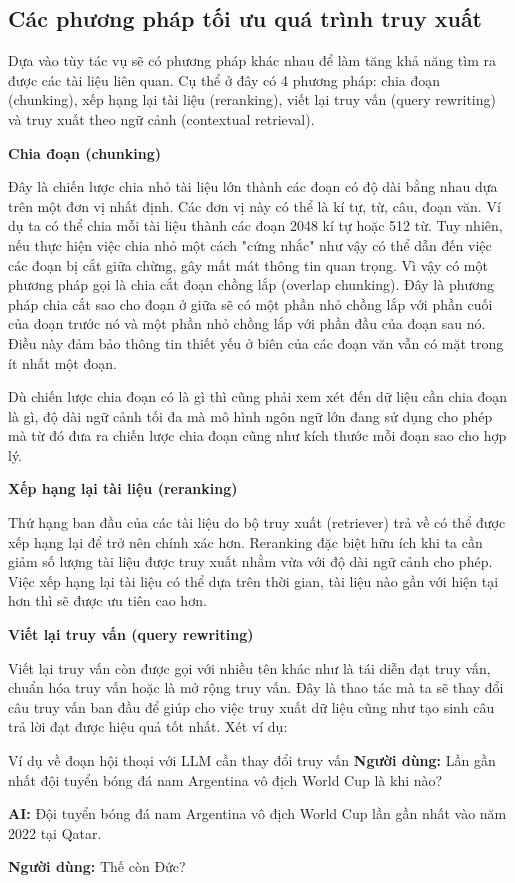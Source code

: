 \vspace{1em}
\subsection{Các phương pháp tối ưu quá trình truy xuất}
Dựa vào tùy tác vụ sẽ có phương pháp khác nhau để làm tăng khả năng tìm ra được các tài liệu liên quan. Cụ thể ở đây có 4 phương pháp: chia đoạn (chunking), xếp hạng lại tài liệu (reranking), viết lại truy vấn (query rewriting) và truy xuất theo ngữ cảnh (contextual retrieval).

\vspace{1em}
\textbf{Chia đoạn (chunking)}

Đây là chiến lược chia nhỏ tài liệu lớn thành các đoạn có độ dài bằng nhau dựa trên một đơn vị nhất định. Các đơn vị này có thể là kí tự, từ, câu, đoạn văn. Ví dụ ta có thể chia mỗi tài liệu thành các đoạn 2048 kí tự hoặc 512 từ. Tuy nhiên, nếu thực hiện việc chia nhỏ một cách "cứng nhắc" như vậy có thể dẫn đến việc các đoạn bị cắt giữa chừng, gây mất mát thông tin quan trọng. Vì vậy có một phương pháp gọi là chia cắt đoạn chồng lắp (overlap chunking). Đây là phương pháp chia cắt sao cho đoạn ở giữa sẽ có một phần nhỏ chồng lắp với phần cuối của đoạn trước nó và một phần nhỏ chồng lắp với phần đầu của đoạn sau nó. Điều này đảm bảo thông tin thiết yếu ở biên của các đoạn văn vẫn có mặt trong ít nhất một đoạn.

Dù chiến lược chia đoạn có là gì thì cũng phải xem xét đến dữ liệu cần chia đoạn là gì, độ dài ngữ cảnh tối đa mà mô hình ngôn ngữ lớn đang sử dụng cho phép mà từ đó đưa ra chiến lược chia đoạn cũng như kích thước mỗi đoạn sao cho hợp lý.

\vspace{1em}
\textbf{Xếp hạng lại tài liệu (reranking)}

Thứ hạng ban đầu của các tài liệu do bộ truy xuất (retriever) trả về có thể được xếp hạng lại để trở nên chính xác hơn. Reranking đặc biệt hữu ích khi ta cần giảm số lượng tài liệu được truy xuất nhằm vừa với độ dài ngữ cảnh cho phép. Việc xếp hạng lại tài liệu có thể dựa trên thời gian, tài liệu nào gần với hiện tại hơn thì sẽ được ưu tiên cao hơn.

\vspace{1em}
\textbf{Viết lại truy vấn (query rewriting)}

Viết lại truy vấn còn được gọi với nhiều tên khác như là tái diễn đạt truy vấn, chuẩn hóa truy vấn hoặc là mở rộng truy vấn. Đây là thao tác mà ta sẽ thay đổi câu truy vấn ban đầu để giúp cho việc truy xuất dữ liệu cũng như tạo sinh câu trả lời đạt được hiệu quả tốt nhất. Xét ví dụ: 
\begin{promptbox}{Ví dụ về đoạn hội thoại với LLM cần thay đổi truy vấn}
\textbf{Người dùng:}
Lần gần nhất đội tuyển bóng đá nam Argentina vô địch World Cup là khi nào?

\textbf{AI:} Đội tuyển bóng đá nam Argentina vô địch World Cup lần gần nhất vào năm 2022 tại Qatar.

\textbf{Người dùng:} Thế còn Đức?
\end{promptbox}

